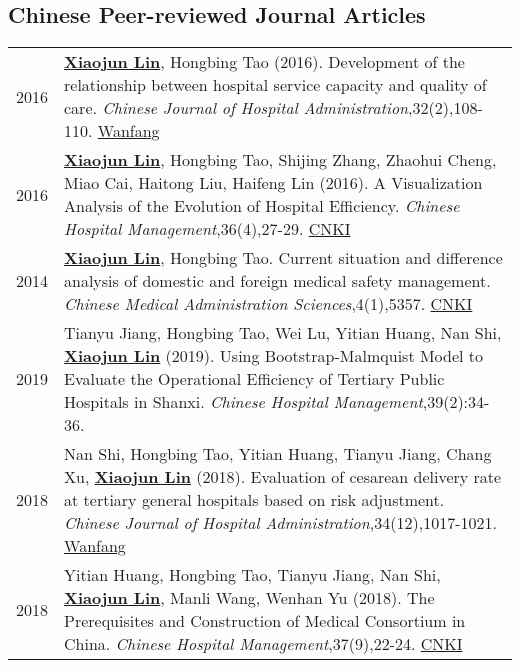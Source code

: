 \documentclass[a4paper,10pt]{article}
\begin{document}
\subsection*{Chinese Peer-reviewed Journal Articles}
\begin{longtable}{r p{13cm}}

2016 & \underline{\textbf{Xiaojun Lin}}, Hongbing Tao (2016). Development of the relationship between hospital service capacity and quality of care. \emph{Chinese Journal of Hospital Administration},32(2),108-110. \href{http://www.wanfangdata.com.cn/details/detail.do?_type=perio&id=zhyygl201602010}{Wanfang}\\[5pt]

2016 & \underline{\textbf{Xiaojun Lin}}, Hongbing Tao, Shijing Zhang, Zhaohui Cheng, Miao Cai, Haitong Liu, Haifeng Lin (2016). A Visualization Analysis of the Evolution of Hospital Efficiency. \emph{Chinese Hospital Management},36(4),27-29. \href{http://kns.cnki.net/KCMS/detail/detail.aspx?dbcode=CJFQ&dbname=CJFDLAST2016&filename=YYGL201604015&v=MjM5ODRSTEtlWnVadEZpRG5VNy9MUERUTVlyRzRIOWZNcTQ5RVlZUjhlWDFMdXhZUzdEaDFUM3FUcldNMUZyQ1U=}{CNKI}\\[5pt]

2014 & \underline{\textbf{Xiaojun Lin}}, Hongbing Tao. Current situation and difference analysis of domestic and foreign medical safety management. \emph{Chinese Medical Administration Sciences},4(1),5357. \href{http://kns.cnki.net/KCMS/detail/detail.aspx?dbcode=CJFQ&dbname=CJFD2014&filename=YLGL201401019&v=MjQzMzVUcldNMUZyQ1VSTEtlWnVadEZpRG5WNy9JUENITVlyRzRIOVhNcm85RWJZUjhlWDFMdXhZUzdEaDFUM3E=}{CNKI}\\[5pt]

2019 & Tianyu Jiang, Hongbing Tao, Wei Lu, Yitian Huang, Nan Shi, \underline{\textbf{Xiaojun Lin}} (2019). Using Bootstrap-Malmquist Model to Evaluate the Operational Efficiency of Tertiary Public Hospitals in Shanxi.  \emph{Chinese Hospital Management},39(2):34-36. \\[5pt]

2018 & Nan Shi, Hongbing Tao, Yitian Huang, Tianyu Jiang, Chang Xu, \underline{\textbf{Xiaojun Lin}} (2018). Evaluation of cesarean delivery rate at tertiary general hospitals based on risk adjustment. \emph{Chinese Journal of Hospital Administration},34(12),1017-1021. \href{http://www.wanfangdata.com.cn/details/detail.do?_type=perio&id=zhyygl201812011}{Wanfang} \\[5pt]

2018 & Yitian Huang, Hongbing Tao, Tianyu Jiang, Nan Shi, \underline{\textbf{Xiaojun Lin}}, Manli Wang, Wenhan Yu (2018). The Prerequisites and Construction of Medical Consortium in China. \emph{Chinese Hospital Management},37(9),22-24. \href{http://kns.cnki.net/KCMS/detail/detail.aspx?dbcode=CJFQ&dbname=CJFDLAST2018&filename=YYGL201809005&v=MjIxMjdlWnVadEZpRGxWNzNPUERUTVlyRzRIOW5NcG85RllZUjhlWDFMdXhZUzdEaDFUM3FUcldNMUZyQ1VSTEs=}{CNKI} \\[5pt]


\end{longtable}
\end{document}
